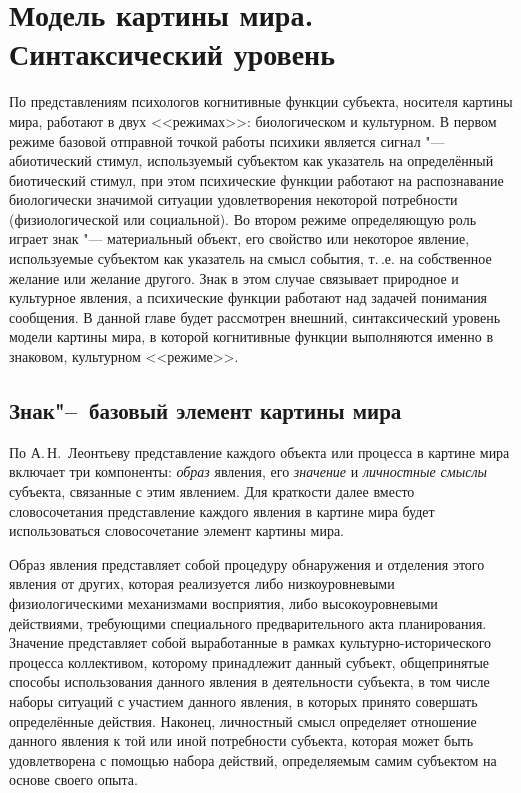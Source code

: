 \chapter{Модель картины мира. Синтаксический уровень} \label{chapt2}

По представлениям психологов \cite{Chudova2012,Chudova2014} когнитивные функции субъекта, носителя картины мира, работают в двух <<режимах>>: биологическом и культурном. В первом режиме базовой отправной точкой работы психики является сигнал "--- абиотический стимул, используемый субъектом как указатель на определённый биотический стимул, при этом психические функции работают на распознавание биологически значимой ситуации удовлетворения некоторой потребности (физиологической или социальной). Во втором режиме определяющую роль играет знак "--- материальный объект, его свойство или некоторое явление, используемые субъектом как указатель на смысл события, т.\,.е. на собственное желание или желание другого. Знак в этом случае связывает природное и культурное явления, а психические функции работают над задачей понимания сообщения. В данной главе будет рассмотрен внешний, синтаксический уровень модели картины мира, в которой когнитивные функции выполняются именно в знаковом, культурном <<режиме>>.

\section{Знак"--~базовый элемент картины мира} \label{sect2_1}

По А.\,Н.~Леонтьеву \cite{Leontiev1975} представление каждого объекта или процесса в картине мира включает три компоненты: \textit{образ} явления, его \textit{значение} и \textit{личностные смыслы} субъекта, связанные с этим явлением. Для краткости далее вместо словосочетания представление каждого явления в картине мира будет использоваться словосочетание элемент картины мира.

Образ явления представляет собой процедуру обнаружения и отделения этого явления от других, которая реализуется либо низкоуровневыми физиологическими механизмами восприятия, либо высокоуровневыми действиями, требующими специального предварительного акта планирования. Значение представляет собой выработанные в рамках культурно-исторического процесса коллективом, которому принадлежит данный субъект, общепринятые способы использования данного явления в деятельности субъекта, в том числе наборы ситуаций с участием данного явления, в которых принято совершать определённые действия. Наконец, личностный смысл определяет отношение данного явления к той или иной потребности субъекта, которая может быть удовлетворена с помощью набора действий, определяемым самим субъектом на основе своего опыта.

